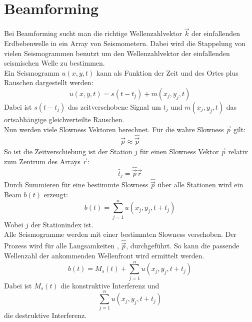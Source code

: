 \section{Beamforming}
Bei Beamforming sucht man die richtige Wellenzahlvektor $\vec{k}$ der einfallenden Erdbebenwelle in ein Array von Seismometern. Dabei wird die Stappelung von vielen Seismogrammen benutzt um den Wellenzahlvektor der einfallenden seismischen Welle zu bestimmen.\\
Ein Seismogramm $u(x,y,t)$ kann als Funktion der Zeit und des Ortes plus Rauschen dargestellt werden:
\begin{equation}
u(x,y,t) = s(t-t_{j})+m(x_{j},y_{j},t)
\end{equation}
Dabei ist $s(t-t_{j})$ das zeitverschobene Signal um $t_j$ und $m(x_{j},y_{j},t)$ das ortsabhängige gleichverteilte Rauschen.\\
Nun werden viele Slowness Vektoren berechnet. Für die wahre Slowness $\vec{p}$ gilt: 
\[
\vec{p} \approx \hat{\vec{p}}
\]
So ist die Zeitverschiebung ist der Station $j$ für einen Slowness Vektor $\hat{\vec{p}}$ relativ zum Zentrum des Arrays $\vec{r}$:
\begin{equation}
\hat{t}_{j}=\hat{\vec{p}} \vec{r}
\end{equation}
Durch Summieren für eine bestimmte Slowness $\hat{\vec{p}}$ über alle Stationen wird ein Beam $b(t)$ erzeugt:
\begin{equation}
 b(t) = \sum_{j=1}^{n} u( x_j,y_j,t+t_j)
\end{equation}
Wobei $j$ der Stationindex ist.\\
Alle Seismogramme werden mit einer bestimmten Slowness verschoben. Der Prozess wird für alle Langsamkeiten , $\hat{\vec{p}}$, durchgeführt. So kann die passende Wellenzahl der ankommenden Wellenfront wird ermittelt werden.
\begin{equation}
b(t) = M_s(t)+ \sum_{j=1}^n u( x_j,y_j,t+t_j)
\end{equation}
Dabei ist $M_s(t)$ die konstruktive Interferenz und
\[
\sum_{j=1}^n u( x_j,y_j,t+t_j)
\]
die destruktive Interferenz.
